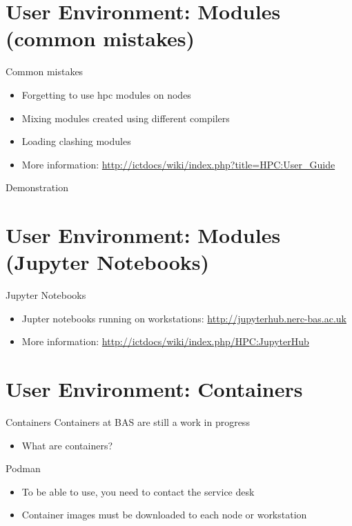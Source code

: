 {
\section{User Environment: Modules (common mistakes)}
%
\begin{frame}{Common mistakes}
\begin{itemize}
\item Forgetting to use hpc modules on nodes
\item Mixing modules created using different compilers
\item Loading clashing modules
\item More information: \href{http://ictdocs/wiki/index.php?title=HPC:User_Guide}{http://ictdocs/wiki/index.php?title=HPC:User_Guide}
\end{itemize}
\item{{\color{red}Demonstration}}
\end{frame}
}

{
\section{User Environment: Modules (Jupyter Notebooks)}
%
\begin{frame}{Jupyter Notebooks}
\begin{itemize}
\item Jupter notebooks running on workstations: \href{http://jupyterhub.nerc-bas.ac.uk}{http://jupyterhub.nerc-bas.ac.uk}
\item More information: \href{http://ictdocs/wiki/index.php/HPC:JupyterHub}{http://ictdocs/wiki/index.php/HPC:JupyterHub}
\end{itemize}
\end{frame}
}

{
\section{User Environment: Containers}
%
\begin{frame}{Containers}
\text Containers at BAS are still a work in progress
\begin{itemize}
\item What are containers?
\end{itemize}
\text Podman
\begin{itemize}
\item To be able to use, you need to contact the service desk
\item Container images must be downloaded to each node or workstation
\end{itemize}
\end{frame}
}

